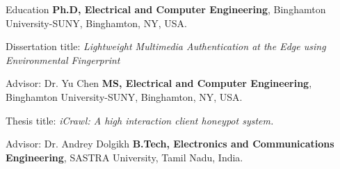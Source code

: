 \begin{rubric}{Education}
\entry*[2017 -- 2023]%
	\textbf{Ph.D, Electrical and Computer Engineering}, Binghamton University-SUNY, Binghamton, NY, USA.
	\par Dissertation title: \emph{Lightweight Multimedia Authentication at the Edge using Environmental Fingerprint}
	\par Advisor: Dr. Yu Chen
%
\entry*[2015 -- 2016]%
	\textbf{MS, Electrical and Computer Engineering}, Binghamton University-SUNY, Binghamton, NY, USA.
	\par Thesis title: \emph{iCrawl: A high interaction client honeypot system.}
	\par Advisor: Dr. Andrey Dolgikh
%	
\entry*[2011 -- 2015]%
	\textbf{B.Tech, Electronics and Communications Engineering}, SASTRA University, Tamil Nadu, India.
\end{rubric}